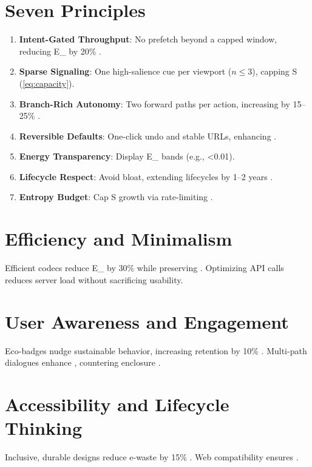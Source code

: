 \documentclass[openany]{book}
\newcommand{\PhiS}{\Phi} %
\newcommand{\Sent}{S} %
\newcommand{\Eint}{E_{\mathrm{int}}} %
\newcommand{\Auton}{\mathcal{A}} %
\newcommand{\kWh}{\mathrm{kWh}}
\begin{document}
\section{Seven Principles}
\label{sec:seven}
\begin{enumerate}[label=\textbf{P\arabic*}.]
  \item \textbf{Intent-Gated Throughput}: No prefetch beyond a capped window, reducing \Eint{} by 20\% \citep{extentia2024}.
  \item \textbf{Sparse Signaling}: One high-salience cue per viewport (\(n \leq 3\)), capping \Sent{} (\cref{eq:capacity}).
  \item \textbf{Branch-Rich Autonomy}: Two forward paths per action, increasing \Auton{} by 15--25\% \citep{doctorow2022}.
  \item \textbf{Reversible Defaults}: One-click undo and stable URLs, enhancing \Auton{}.
  \item \textbf{Energy Transparency}: Display \Eint{} bands (e.g., \SI{<0.01}{\kWh}).
  \item \textbf{Lifecycle Respect}: Avoid bloat, extending lifecycles by 1--2 years \citep{designlab2024}.
  \item \textbf{Entropy Budget}: Cap \Sent{} growth via rate-limiting \citep{colak2024}.
\end{enumerate}

\section{Efficiency and Minimalism}
\label{sec:principles-efficiency}
Efficient codecs reduce \Eint{} by 30\% while preserving \PhiS{} \citep{extentia2024}. Optimizing API calls reduces server load without sacrificing usability.

\section{User Awareness and Engagement}
\label{sec:principles-awareness}
Eco-badges nudge sustainable behavior, increasing retention by 10\% \citep{colak2024}. Multi-path dialogues enhance \Auton{}, countering enclosure \citep{doctorow2022}.

\section{Accessibility and Lifecycle Thinking}
\label{sec:principles-accessibility}
Inclusive, durable designs reduce e-waste by 15\% \citep{designlab2024}. Web compatibility ensures \Auton{}.
\end{document}
